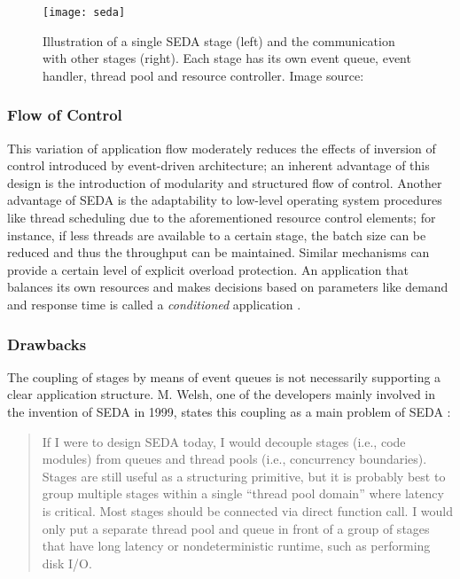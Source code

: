 \begin{figure}
\centering\small
\setlength{\tabcolsep}{0mm}
  \texttt{[image: seda]}
\caption{
Illustration of a single SEDA stage (left) and the communication with other stages (right). Each stage has its own event queue, event handler, thread pool and resource controller. Image source: \cite{Welsh2001}
}
\label{fig:seda}
\end{figure}

\subsubsection*{Flow of Control}
This variation of application flow moderately reduces the effects of inversion of control introduced by event-driven architecture; an inherent advantage of this design is the introduction of modularity and structured flow of control. Another advantage of SEDA is the adaptability to low-level operating system procedures like thread scheduling due to the aforementioned resource control elements; for instance, if less threads are available to a certain stage, the batch size can be reduced and thus the throughput can be maintained. Similar mechanisms can provide a certain level of explicit overload protection. An application that balances its own resources and makes decisions based on parameters like demand and response time is called a \textit{conditioned} application \cite{Welsh2001}. 

\subsubsection*{Drawbacks}
The coupling of stages by means of event queues is not necessarily supporting a clear application structure. M. Welsh, one of the developers mainly involved in the invention of SEDA in 1999, states this coupling as a main problem of SEDA \cite{seda}: 

\begin{quote}
If I were to design SEDA today, I would decouple stages (i.e., code modules) from queues and thread pools (i.e., concurrency boundaries). Stages are still useful as a structuring primitive, but it is probably best to group multiple stages within a single ``thread pool domain'' where latency is critical. Most stages should be connected via direct function call. I would only put a separate thread pool and queue in front of a group of stages that have long latency or nondeterministic runtime, such as performing disk I/O.
\end{quote}

